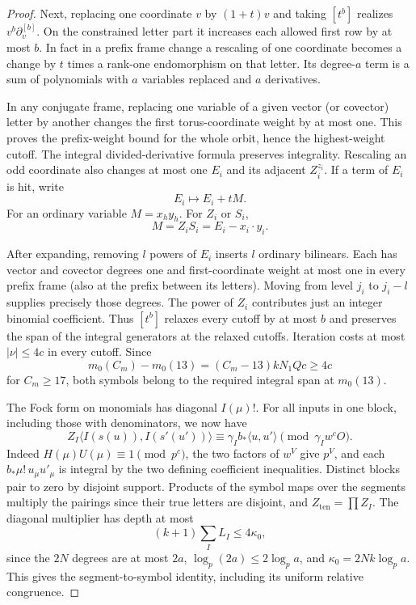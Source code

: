 \begin{proof}
Next, replacing one coordinate \(v\) by \((1+t)v\) and taking
\([t^b]\) realizes \(v^b\partial_v^{[b]}\).
On the constrained letter part it increases each allowed first
row by at most \(b\). In fact in a prefix frame change a
rescaling of one coordinate becomes a change by \(t\) times a
rank-one endomorphism on that letter. Its degree-\(a\) term
is a sum of polynomials with \(a\) variables replaced and
\(a\) derivatives.

In any conjugate frame, replacing one
variable of a given vector (or covector) letter by another
changes the first torus-coordinate weight by at most one.
This proves the prefix-weight bound for the whole orbit, hence
the highest-weight cutoff. The integral divided-derivative
formula preserves integrality. Rescaling an odd coordinate also
changes at most one \(E_i\) and its adjacent \(Z_i^{z_i}\).
If a term of \(E_i\) is hit, write
\[
 E_i\mapsto E_i+tM.
\]
For an ordinary variable \(M=x_h y_h\).
For \(Z_i\) or \(S_i\),
\[
 M=Z_iS_i=E_i-x_i\cdot y_i.
\]

After expanding, removing \(l\) powers of \(E_i\) inserts
\(l\) ordinary bilinears. Each has vector and covector degrees
one and first-coordinate weight at most one in every prefix
frame (also at the prefix between its letters). Moving from
level \(j_i\) to \(j_i-l\) supplies precisely those degrees.
The power of \(Z_i\) contributes just an integer binomial
coefficient. Thus \([t^b]\) relaxes every cutoff by at most
\(b\) and preserves the span of the integral generators at the
relaxed cutoffs. Iteration costs at most \(|\nu|\le4c\) in
every cutoff. Since
\[
 m_0(C_m)-m_0(13)=(C_m-13)kN_1Qc\ge4c
\]
for \(C_m\ge17\),
both symbols belong to the required integral span at
\(m_0(13)\).

The Fock form on monomials has diagonal \(I(\mu)!\).
For all inputs in one block, including those with denominators,
we now have
\[
 Z_I\langle I(s(u)), I(s'(u'))\rangle
   \equiv \gamma_I b_*\langle u,u'\rangle
                  \pmod{\gamma_I w^c O}.
\]
Indeed \(H(\mu)U(\mu)\equiv1\pmod{p^c}\), the two factors of
\(w^V\) give \(p^V\), and each
\(b_*\mu!\,u_\mu u'_\mu\) is integral by the two defining
coefficient inequalities. Distinct blocks pair to zero by
disjoint support. Products of the symbol maps over the segments
multiply the pairings since their true letters are disjoint,
and \(Z_{\mathrm{ten}}=\prod Z_I\). The diagonal multiplier
has depth at most
\[
 (k+1)\sum_I L_I\le4\kappa_0,
\]
since the \(2N\) degrees
are at most \(2a\), \(\log_p(2a)\le2\log_p a\), and
\(\kappa_0=2Nk\log_p a\). This gives the segment-to-symbol
identity, including its uniform relative congruence.


\end{proof}
